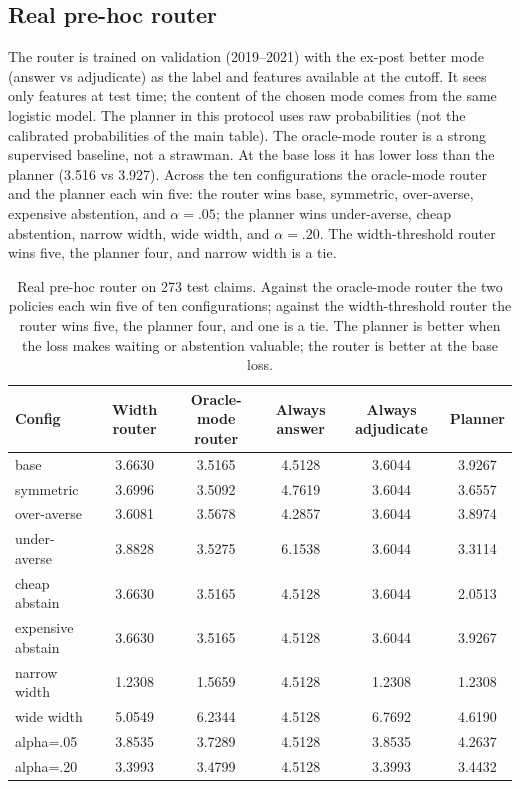 \documentclass[11pt]{article}
\begin{document}
\subsection{Real pre-hoc router}
\label{app:router}
The router is trained on validation (2019--2021) with the ex-post better mode
(answer vs adjudicate) as the label and features available at the cutoff. It
sees only features at test time; the content of the chosen mode comes from the
same logistic model. The planner in this protocol uses raw probabilities (not
the calibrated probabilities of the main table). The oracle-mode router is a
strong supervised baseline, not a strawman. At the base loss it has lower loss
than the planner (3.516 vs 3.927). Across the ten configurations the oracle-mode
router and the planner each win five: the router wins base, symmetric,
over-averse, expensive abstention, and $\alpha=.05$; the planner wins
under-averse, cheap abstention, narrow width, wide width, and $\alpha=.20$.
The width-threshold router wins five, the planner four, and narrow width is a
tie.

\begin{table}[t]
\centering
\small
\setlength{\tabcolsep}{4pt}
\begin{tabular}{lccccc}
\toprule
Config & Width router & Oracle-mode router & Always answer & Always adjudicate & Planner \\
\midrule
base & 3.6630 & 3.5165 & 4.5128 & 3.6044 & 3.9267 \\
symmetric & 3.6996 & 3.5092 & 4.7619 & 3.6044 & 3.6557 \\
over-averse & 3.6081 & 3.5678 & 4.2857 & 3.6044 & 3.8974 \\
under-averse & 3.8828 & 3.5275 & 6.1538 & 3.6044 & 3.3114 \\
cheap abstain & 3.6630 & 3.5165 & 4.5128 & 3.6044 & 2.0513 \\
expensive abstain & 3.6630 & 3.5165 & 4.5128 & 3.6044 & 3.9267 \\
narrow width & 1.2308 & 1.5659 & 4.5128 & 1.2308 & 1.2308 \\
wide width & 5.0549 & 6.2344 & 4.5128 & 6.7692 & 4.6190 \\
alpha=.05 & 3.8535 & 3.7289 & 4.5128 & 3.8535 & 4.2637 \\
alpha=.20 & 3.3993 & 3.4799 & 4.5128 & 3.3993 & 3.4432 \\
\bottomrule
\end{tabular}
\caption{Real pre-hoc router on 273 test claims. Against the oracle-mode router
the two policies each win five of ten configurations; against the
width-threshold router the router wins five, the planner four, and one is a
tie. The planner is better when the loss makes waiting or abstention valuable;
the router is better at the base loss.}
\label{tab:router}
\end{table}
\end{document}
